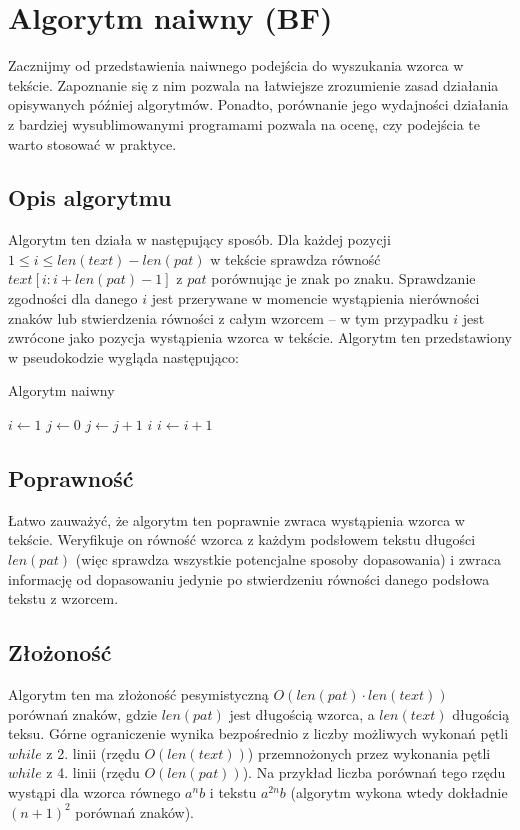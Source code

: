 \section{Algorytm naiwny (BF)}
Zacznijmy od przedstawienia naiwnego podejścia do wyszukania wzorca w tekście. Zapoznanie się z nim pozwala na łatwiejsze zrozumienie zasad działania opisywanych później algorytmów. Ponadto, porównanie jego wydajności działania z bardziej wysublimowanymi programami pozwala na ocenę, czy podejścia te warto stosować w praktyce.

\subsection{Opis algorytmu}
Algorytm ten działa w następujący sposób. Dla każdej pozycji $1 \leq i \leq len(text)-len(pat)$ w tekście sprawdza równość $text[i:i+len(pat)-1]$ z $pat$ porównując je znak po znaku. Sprawdzanie zgodności dla danego $i$ jest przerywane w momencie wystąpienia nierówności znaków lub stwierdzenia równości z całym wzorcem -- w tym przypadku $i$ jest zwrócone jako pozycja wystąpienia wzorca w tekście. 
\newpage
\noindent
Algorytm ten przedstawiony w pseudokodzie wygląda następująco:
\begin{algorithm}
\caption{Algorytm naiwny}\label{alg:nai}
\begin{algorithmic}[1]
\State $i \gets 1$
    \State $j \gets 0$
        \State $j \gets j + 1$
    \EndWhile
        \State \Return $i$
    \EndIf
    \State $i \gets i + 1$
\EndWhile
\end{algorithmic}
\end{algorithm}

\subsection{Poprawność}
Łatwo zauważyć, że algorytm ten poprawnie zwraca wystąpienia wzorca w tekście. Weryfikuje on równość wzorca z każdym podsłowem tekstu długości $len(pat)$ (więc sprawdza wszystkie potencjalne sposoby dopasowania) i zwraca informację od dopasowaniu jedynie po stwierdzeniu równości danego podsłowa tekstu z wzorcem.

\subsection{Złożoność}
Algorytm ten ma złożoność pesymistyczną $O(len(pat) \cdot len(text))$ porównań znaków, gdzie $len(pat)$ jest długością wzorca, a $len(text)$ długością teksu. Górne ograniczenie wynika bezpośrednio z liczby możliwych wykonań pętli $while$ z 2. linii (rzędu $O(len(text))$) przemnożonych przez wykonania pętli $while$ z 4. linii (rzędu $O(len(pat))$). Na przykład liczba porównań tego rzędu wystąpi dla wzorca równego $a^nb$ i tekstu $a^{2n}b$ (algorytm wykona wtedy dokładnie $(n+1)^2$ porównań znaków).


